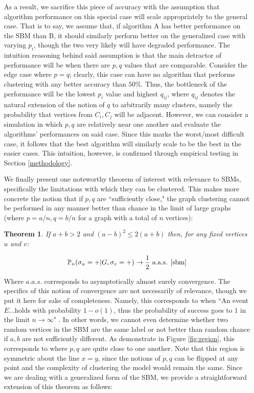 \documentclass{article}
\newtheorem{theorem}{Theorem}[section]
\begin{document}
As a result, we sacrifice this piece of accuracy with the assumption that algorithm performance on this special case will scale appropriately to the general case. That is to say, we assume that, if algorithm A has better performance on the SBM than B, it should similarly perform better on the generalized case with varying $p_i$, though the two very likely will have degraded performance. The intuition reasoning behind said assumption is that the main detractor of performance will be when there are $p,q$ values that are comparable. Consider the edge case where $p=q$; clearly, this case can have no algorithm that performs clustering with any better accuracy than $50\%$. Thus, the bottleneck of the performance will be the lowest $p_i$ value and highest $q_{ij}$, where $q_{ij}$ denotes the natural extension of the notion of $q$ to arbitrarily many clusters, namely the probability that vertices from $C_i,C_j$ will be adjacent. However, we can consider a simulation in which $p,q$ are relatively near one another and evaluate the algorithms' performances on said case. Since this marks the worst/most difficult case, it follows that the best algorithm will similarly scale to be the best in the easier cases. This intuition, however, is confirmed through empirical testing in Section \ref{methodology}.

We finally present one noteworthy theorem of interest with relevance to SBMs, specifically the limitations with which they can be clustered. This makes more concrete the notion that if $p,q$ are ``sufficiently close," the graph clustering cannot be performed in any manner better than chance in the limit of large graphs (where $p=a/n,q=b/n$ for a graph with a total of $n$ vertices):

\begin{theorem}\label{thm:sbm}
If $a + b > 2$ and $(a-b)^2\le2(a+b)$ then, for any fixed vertices $u$ and $v$:

$$ \mathbb{P}_n(\sigma_u = + | G, \sigma_v = +) \rightarrow \frac{1}{2} \text{ a.a.s. \cite{sbm}} $$
\end{theorem}

Where $a.a.s.$ corresponds to asymptotically almost surely convergence. The specifics of this notion of convergence are not necessarily of relevance, though we put it here for sake of completeness. Namely, this corresponds to when ``An event $E$...holds with probability $1-o(1)$, thus the probability of success goes to $1$ in the limit $n\rightarrow\infty$" \cite{terry}. In other words, we cannot even determine whether two random vertices in the SBM are the same label or not better than random chance if $a,b$ are not sufficiently different. As demonstrate in Figure \ref{fig:region}, this corresponds to where $p,q$ are quite close to one another. Note that this region is symmetric about the line $x=y$, since the notions of $p,q$ can be flipped at any point and the complexity of clustering the model would remain the same. Since we are dealing with a generalized form of the SBM, we provide a straightforward extension of this theorem as follows:
\end{document}
